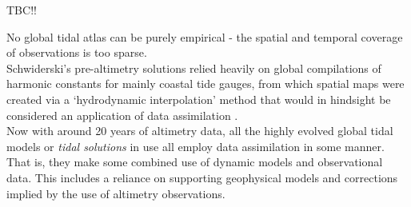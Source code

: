 
TBC!! 


No global tidal atlas can be purely empirical - the spatial and temporal coverage of observations is too sparse.\\
Schwiderski's pre-altimetry solutions relied heavily on global compilations of harmonic constants for mainly coastal tide gauges, from which spatial maps were created via a `hydrodynamic interpolation' method that would in hindsight be considered an application of data assimilation \cite[pp822]{Egbert:1994wz}.\\
Now with around 20 years of altimetry data, all the highly evolved global tidal models or \emph{tidal solutions} in use all employ data assimilation in some manner.  That is, they make some combined use of dynamic models and observational data.  This includes a reliance on supporting geophysical models and corrections implied by the use of altimetry observations.\\



